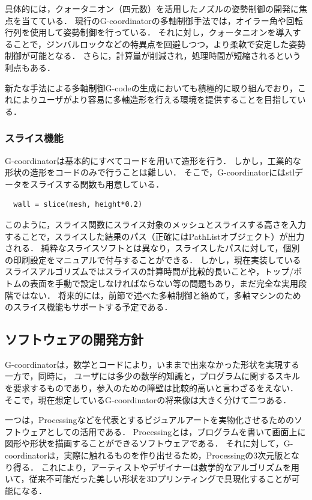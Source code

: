 \documentclass{article}
\begin{document}
\begin{twocolumn}
具体的には，クォータニオン（四元数）を活用したノズルの姿勢制御の開発に焦点を当てている．
現行のG-coordinatorの多軸制御手法では，オイラー角や回転行列を使用して姿勢制御を行っている．
それに対し，クォータニオンを導入することで，ジンバルロックなどの特異点を回避しつつ，より柔軟で安定した姿勢制御が可能となる．\cite{yamaguchi1991}
さらに，計算量が削減され，処理時間が短縮されるという利点もある．

新たな手法による多軸制御G-codeの生成においても積極的に取り組んでおり，これによりユーザがより容易に多軸造形を行える環境を提供することを目指している．

\subsubsection{スライス機能}
G-coordinatorは基本的にすべてコードを用いて造形を行う．
しかし，工業的な形状の造形をコードのみで行うことは難しい．
そこで，G-coordinatorにはstlデータをスライスする関数も用意している．

\begin{lstlisting}
  wall = slice(mesh, height*0.2)
\end{lstlisting}
このように，スライス関数にスライス対象のメッシュとスライスする高さを入力することで，スライスした結果のパス（正確にはPathListオブジェクト）が出力される．
純粋なスライスソフトとは異なり，スライスしたパスに対して，個別の印刷設定をマニュアルで付与することができる．
しかし，現在実装しているスライスアルゴリズムではスライスの計算時間が比較的長いことや，トップ/ボトムの表面を手動で設定しなければならない等の問題もあり，まだ完全な実用段階ではない．
将来的には，前節で述べた多軸制御と絡めて，多軸マシンのためのスライス機能もサポートする予定である．

\subsection{ソフトウェアの開発方針}

G-coordinatorは，数学とコードにより，いままで出来なかった形状を実現する一方で，同時に，
ユーザには多少の数学的知識と，プログラムに関するスキルを要求するものであり，参入のための障壁は比較的高いと言わざるをえない．
そこで，現在想定しているG-coordinatorの将来像は大きく分けて二つある．

一つは，Processingなどを代表とするビジュアルアートを実物化させるためのソフトウェアとしての活用である．
Processingとは，プログラムを書いて画面上に図形や形状を描画することができるソフトウェアである．
それに対して，G-coordinatorは，実際に触れるものを作り出せるため，Processingの3次元版となり得る．
これにより，アーティストやデザイナーは数学的なアルゴリズムを用いて，従来不可能だった美しい形状を3Dプリンティングで具現化することが可能になる．


\end{twocolumn}
\end{document}
